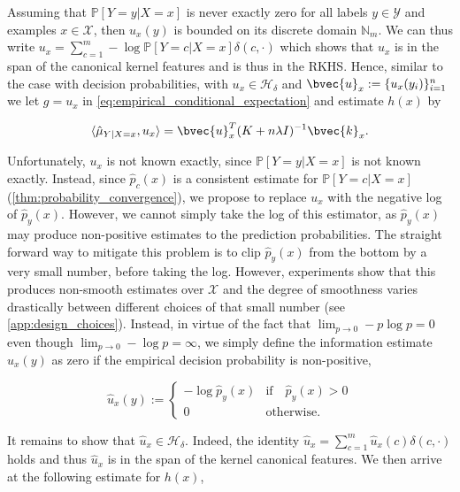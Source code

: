 \documentclass{article}
\begin{document}
	Assuming that $\mathbb{P}[Y = y | X = x]$ is never exactly zero for all labels $y \in \mathcal{Y}$ and examples $x \in \mathcal{X}$, then $u_{x}(y)$ is bounded on its discrete domain $\mathbb{N}_{m}$. We can thus write $u_{x} = \sum_{c = 1}^{m} - \log{\mathbb{P}[Y = c | X = x]} \delta(c, \cdot)$ which shows that $u_{x}$ is in the span of the canonical kernel features and is thus in the RKHS. Hence, similar to the case with decision probabilities, with $u_{x} \in \mathcal{H}_{\delta}$ and $\bvec{u}_{x} := \{u_{x}(y_{i})\}_{i = 1}^{n}$ we let $g = u_{x}$ in \eqref{eq:empirical_conditional_expectation} and estimate $h(x)$ by
	
	\begin{equation}
		\langle \hat{\mu}_{Y | X = x}, u_{x} \rangle = \bvec{u}_{x}^{T} (K + n \lambda I)^{-1} \bvec{k}_{x}.
	\end{equation}
	
	Unfortunately, $u_{x}$ is not known exactly, since $\mathbb{P}[Y = y | X = x]$ is not known exactly. Instead, since $\hat{p}_{c}(x)$ is a consistent estimate for $\mathbb{P}[Y = c | X = x]$ (\cref{thm:probability_convergence}), we propose to replace $u_{x}$ with the negative log of $\hat{p}_{y}(x)$. However, we cannot simply take the log of this estimator, as $\hat{p}_{y}(x)$ may produce non-positive estimates to the prediction probabilities. The straight forward way to mitigate this problem is to clip $\hat{p}_{y}(x)$ from the bottom by a very small number, before taking the log. However, experiments show that this produces non-smooth estimates over $\mathcal{X}$ and the degree of smoothness varies drastically between different choices of that small number (see \cref{app:design_choices}). Instead, in virtue of the fact that $\lim_{p \to 0} - p \log{p} = 0$ even though $\lim_{p \to 0} - \log{p} = \infty$, we simply define the information estimate $\hat{u}_{x}(y)$ as zero if the empirical decision probability is non-positive,
	
	\begin{equation}
		\hat{u}_{x}(y) := \begin{cases}
		- \log{\hat{p}_{y}(x)} & \mathrm{if } \quad \hat{p}_{y}(x) > 0 \\
		0 & \mathrm{otherwise}. \end{cases}
	\label{eq:empirical_information}
	\end{equation}
	
	It remains to show that $\hat{u}_{x} \in \mathcal{H}_{\delta}$. Indeed, the identity $\hat{u}_{x} = \sum_{c = 1}^{m} \hat{u}_{x}(c) \delta(c, \cdot)$ holds and thus $\hat{u}_{x}$ is in the span of the kernel canonical features. We then arrive at the following estimate for $h(x)$,
	
\end{document}
